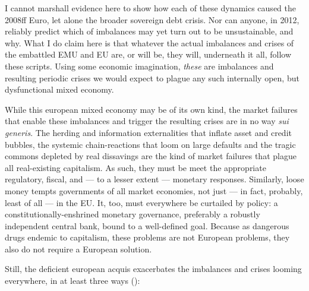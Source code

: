 I cannot marshall evidence here to show how each of these dynamics caused the 2008ff Euro, let alone the broader sovereign debt crisis.
Nor can anyone, in 2012, reliably predict which of imbalances may yet turn out to be unsustainable, and why.
What I do claim here is that whatever the actual imbalances and crises of the embattled \gls{EMU} and \gls{EU} are, or will be, they will, underneath it all, follow these scripts.
Using some economic imagination, \emph{these} are imbalances and resulting periodic crises we would expect to plague any such internally open, but dysfunctional mixed economy.

While this european mixed economy may be of its own kind, the market failures that enable these imbalances and trigger the resulting crises are in no way \emph{sui generis}.
The herding and information externalities that inflate asset and credit bubbles, the systemic chain-reactions that loom on large defaults and the tragic commons depleted by real dissavings are the kind of market failures that plague all real-existing capitalism.
As such, they must be meet the appropriate regulatory, fiscal, and --- to a lesser extent --- monetary responses.
Similarly, loose money tempts governments of all market economies, not just --- in fact, probably, least of all --- in the \gls{EU}.
It, too, must everywhere be curtailed by policy:
a constitutionally-enshrined monetary governance, preferably a robustly independent central bank, bound to a well-defined goal.
Because as dangerous drugs endemic to capitalism, these problems are not European problems, they also do not require a European solution.

Still, the deficient european acquis exacerbates the imbalances and crises looming everywhere, in at least three ways (\citep[echoed by][25]{Bordo2011}):

